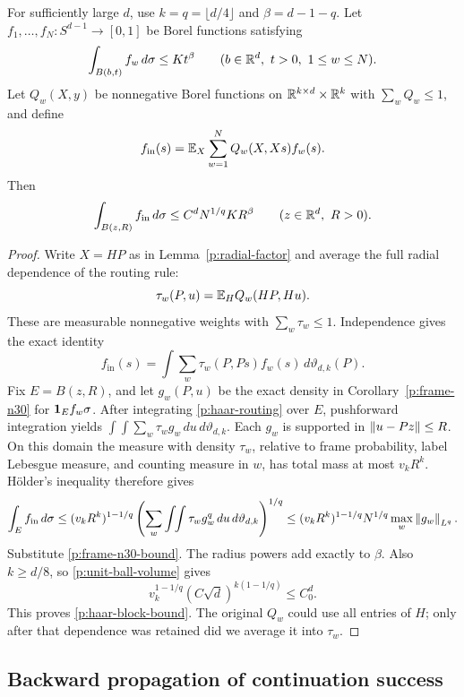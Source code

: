 \begin{proposition}\label{p:haar-block}
For sufficiently large \(d\), use \(k=q=\lfloor d/4\rfloor\) and
\(\beta=d-1-q\).
Let \(f_1,\ldots,f_N:S^{d-1}\to[0,1]\) be Borel functions satisfying
\[
 \int_{B(b,t)}f_w\,d\sigma\le Kt^\beta
 \qquad(b\in\mathbb R^d,\ t>0,\ 1\le w\le N).
\]
Let \(Q_w(X,y)\) be nonnegative Borel functions on
\(\mathbb R^{k\times d}\times\mathbb R^k\) with \(\sum_wQ_w\le1\), and define
\[
 f_{\mathrm{in}}(s)=\mathbb E_X\sum_{w=1}^N Q_w(X,Xs)f_w(s).
\]
Then
\begin{equation}\label{p:haar-block-bound}
 \int_{B(z,R)}f_{\mathrm{in}}\,d\sigma
 \le C^dN^{1/q}K R^\beta
 \qquad(z\in\mathbb R^d,\ R>0).
\end{equation}
\end{proposition}

\begin{proof}
Write \(X=HP\) as in Lemma~\ref{p:radial-factor} and average the full
radial dependence of the routing rule:
\[
 \tau_w(P,u)=\mathbb E_H Q_w(HP,Hu).
\]
These are measurable nonnegative weights with \(\sum_w\tau_w\le1\).
Independence gives the exact identity
\begin{equation}\label{p:haar-routing}
 f_{\mathrm{in}}(s)=
 \int\sum_w\tau_w(P,Ps)f_w(s)\,d\vartheta_{d,k}(P).
\end{equation}
Fix \(E=B(z,R)\), and let \(g_w(P,u)\) be the exact density in
Corollary~\ref{p:frame-n30} for \(\mathbf 1_Ef_w\sigma\). After integrating
\eqref{p:haar-routing} over \(E\), pushforward integration yields
\(\int\!\int\sum_w\tau_w g_w\,du\,d\vartheta_{d,k}\).
Each \(g_w\) is supported in \(\left\lVert u-Pz\right\rVert\le R\).
On this domain the measure with density \(\tau_w\), relative to frame
probability, label Lebesgue measure, and counting measure in \(w\), has
total mass at most \(v_kR^k\). Hölder's inequality therefore gives
\[
 \int_E f_{\mathrm{in}}\,d\sigma
 \le (v_kR^k)^{1-1/q}
 \left(\sum_w\int\!\!\int\tau_w g_w^q\,du\,d\vartheta_{d,k}\right)^{1/q}
 \le (v_kR^k)^{1-1/q}N^{1/q}\max_w\left\lVert g_w\right\rVert_{L^q}.
\]
Substitute \eqref{p:frame-n30-bound}. The radius powers add exactly to
\(\beta\). Also \(k\ge d/8\), so \eqref{p:unit-ball-volume} gives
\[
 v_k^{1-1/q}(C\sqrt d)^{k(1-1/q)}\le C_0^d.
\]
This proves \eqref{p:haar-block-bound}. The original \(Q_w\) could use
all entries of \(H\); only after that dependence was retained did we
average it into \(\tau_w\).
\end{proof}

\subsection{Backward propagation of continuation success}

